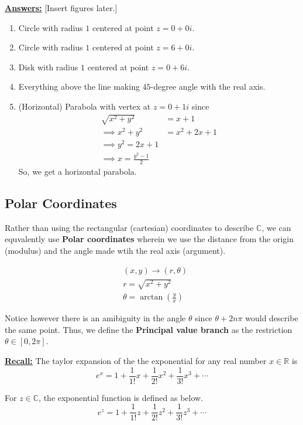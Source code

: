 \documentclass{article}
\newcommand{\R}{\mathbb{R}}
\newcommand{\C}{\mathbb{C}}
\begin{document}
\vskip 0.5cm
\underline{\textbf{Answers:}} [Insert figures later.]
\begin{enumerate}
  \item Circle with radius $1$ centered at point $z = 0 + 0i$.
  \item Circle with radius $1$ centered at point $z = 6 + 0i$.
  \item Disk with radius $1$ centered at point $z = 0 + 6i$.
  \item Everything above the line making $45$-degree angle with the real axis.
  \item (Horizontal) Parabola with vertex at $z = 0 + 1i$ since 
  \begin{align*}
    \sqrt{x^2 + y^2} &= x + 1 \\ 
    \implies x^2 + y^2 &= x^2 + 2x + 1 \\
    \implies y^2 = 2x + 1 \\
    \implies x = \frac{y^2 - 1}{2}
  \end{align*}
  So, we get a horizontal parabola.
\end{enumerate}

\vskip 0.5cm
\subsection{Polar Coordinates}
Rather than using the rectangular (cartesian) coordinates to describe $\C$, we can equvalently use \textbf{Polar coordinates} wherein we use the distance from the origin (modulus) and the angle made wtih the real axis (argument).

\begin{align*}
  &(x, y) \rightarrow (r, \theta) \\
  &r = \sqrt{x^2 + y^2} \\
  &\theta = \arctan\left(\frac{y}{x}\right)
\end{align*}

Notice however there is an amibiguity in the angle $\theta$ since $\theta + 2n\pi$ would describe the same point. Thus, we define the \textbf{Principal value branch} as the restriction $\theta \in [0, 2\pi]$.

\vskip 0.5cm
\underline{\textbf{Recall:}} The taylor expansion of the the exponential for any real number $x \in \R $ is 
\[ e^x = 1 + \frac{1}{1!} x + \frac{1}{2!} x^2 + \frac{1}{3!} x^3 + \cdots \]

\vskip 0.25cm
For $z \in \C$, the exponential function is defined as below.
\[ e^z = 1 + \frac{1}{1!} z + \frac{1}{2!} z^2 + \frac{1}{3!} z^3 + \cdots \]
\end{document}
